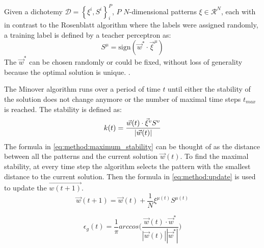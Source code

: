 Given a dichotemy $\mathcal{D} = \left\{\xi^i, S^i \right\}_{i}^{P}$, $P$ $N$-dimensional patterns $\xi \in \mathcal{R}^N$, each with in contrast to the Rosenblatt algorithm where the labels were assigned randomly, a training label is defined by a teacher perceptron as:
\begin{equation}
	S^\mu = \text{sign}(\vec{w}^* \cdot {\vec{\xi}}^{\mu})
\end{equation}
The $\vec{w}^*$ can be chosen randomly or could be fixed, without loss of generality because the optimal solution is unique. .

The Minover algorithm runs over a period of time $t$ until either the stability of the solution does not change anymore or the number of maximal time steps $t_{max}$ is reached. The  stability is defined as: 
\begin{equation}\label{eq:method:maximum_stability}
\mathnormal{k}(t) = \frac{\vec{w}(t) \cdot \vec{\xi}^v S^v}{|\vec{w}(t)|}
\end{equation} 
The formula in \eqref{eq:method:maximum_stability} can be thought of as the distance between all the patterns and the current solution $\vec{w}(t)$. To find the maximal stability, at every time step the algorithm selects the pattern with the smallest distance to the current solution. Then the formula in \eqref{eq:method:update} is used to update the $\vec{w(t + 1)}$.
\begin{equation}\label{eq:method:update}
	\vec{w}(t + 1) = \vec{w}(t) + \frac{1}{N} \xi^{\mu(t)} S^{\mu(t)} 
\end{equation}

\begin{equation}\label{eq:method:generalization_error}
	\epsilon_g(t) = \frac{1}{\pi} arccos \bigg(\frac{\vec{w}(t) \cdot \vec{w}^*}{|\vec{w}(t)| |\vec{w}^*|}\bigg)
\end{equation}